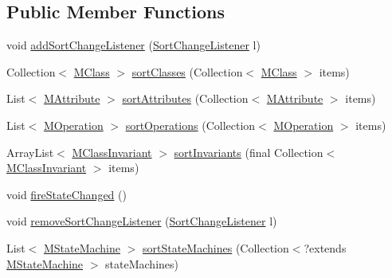 \subsection*{Public Member Functions}
\begin{DoxyCompactItemize}
\item 
void \hyperlink{classorg_1_1tzi_1_1use_1_1gui_1_1main_1_1_model_browser_sorting_ae68bd5a945f1de610b9737072884a801}{add\-Sort\-Change\-Listener} (\hyperlink{interfaceorg_1_1tzi_1_1use_1_1gui_1_1main_1_1_model_browser_sorting_1_1_sort_change_listener}{Sort\-Change\-Listener} l)
\item 
Collection$<$ \hyperlink{interfaceorg_1_1tzi_1_1use_1_1uml_1_1mm_1_1_m_class}{M\-Class} $>$ \hyperlink{classorg_1_1tzi_1_1use_1_1gui_1_1main_1_1_model_browser_sorting_a92848a742d1129ad12f92f5bf3c1546f}{sort\-Classes} (Collection$<$ \hyperlink{interfaceorg_1_1tzi_1_1use_1_1uml_1_1mm_1_1_m_class}{M\-Class} $>$ items)
\item 
List$<$ \hyperlink{classorg_1_1tzi_1_1use_1_1uml_1_1mm_1_1_m_attribute}{M\-Attribute} $>$ \hyperlink{classorg_1_1tzi_1_1use_1_1gui_1_1main_1_1_model_browser_sorting_aa47d0a3461e352247ec2c68da64984d2}{sort\-Attributes} (Collection$<$ \hyperlink{classorg_1_1tzi_1_1use_1_1uml_1_1mm_1_1_m_attribute}{M\-Attribute} $>$ items)
\item 
List$<$ \hyperlink{classorg_1_1tzi_1_1use_1_1uml_1_1mm_1_1_m_operation}{M\-Operation} $>$ \hyperlink{classorg_1_1tzi_1_1use_1_1gui_1_1main_1_1_model_browser_sorting_a02a98148b454e4946b477b2d9f082e03}{sort\-Operations} (Collection$<$ \hyperlink{classorg_1_1tzi_1_1use_1_1uml_1_1mm_1_1_m_operation}{M\-Operation} $>$ items)
\item 
Array\-List$<$ \hyperlink{classorg_1_1tzi_1_1use_1_1uml_1_1mm_1_1_m_class_invariant}{M\-Class\-Invariant} $>$ \hyperlink{classorg_1_1tzi_1_1use_1_1gui_1_1main_1_1_model_browser_sorting_a194cd090c29feb98afcc6d0c877398d3}{sort\-Invariants} (final Collection$<$ \hyperlink{classorg_1_1tzi_1_1use_1_1uml_1_1mm_1_1_m_class_invariant}{M\-Class\-Invariant} $>$ items)
\item 
void \hyperlink{classorg_1_1tzi_1_1use_1_1gui_1_1main_1_1_model_browser_sorting_aa72ed77bce1e24d7021140073640eace}{fire\-State\-Changed} ()
\item 
void \hyperlink{classorg_1_1tzi_1_1use_1_1gui_1_1main_1_1_model_browser_sorting_ac0705a4260a9b0a126ac01d83f4cedd6}{remove\-Sort\-Change\-Listener} (\hyperlink{interfaceorg_1_1tzi_1_1use_1_1gui_1_1main_1_1_model_browser_sorting_1_1_sort_change_listener}{Sort\-Change\-Listener} l)
\item 
List$<$ \hyperlink{classorg_1_1tzi_1_1use_1_1uml_1_1mm_1_1statemachines_1_1_m_state_machine}{M\-State\-Machine} $>$ \hyperlink{classorg_1_1tzi_1_1use_1_1gui_1_1main_1_1_model_browser_sorting_aa78d3567381f621083eeebf21a126a05}{sort\-State\-Machines} (Collection$<$?extends \hyperlink{classorg_1_1tzi_1_1use_1_1uml_1_1mm_1_1statemachines_1_1_m_state_machine}{M\-State\-Machine} $>$ state\-Machines)
\end{DoxyCompactItemize}
